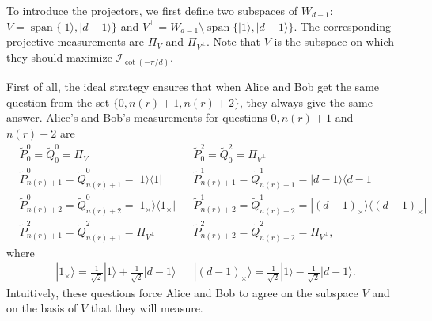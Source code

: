 \documentclass[11pt,letterpaper]{article}
\newcommand{\ket}[1]{|#1\rangle}
\newcommand{\ketbra}[2]{|#1\rangle\langle#2|}
\DeclareMathOperator{\spn}{span}
\newcommand{\1}{\mathbb{1}}
\newcommand{\tP}{\tilde{P}}
\newcommand{\tQ}{\tilde{Q}}
\newcommand{\nr}{n(r)}
\newcommand{\I}{\mathcal{I}}
\theoremstyle{definition}
\begin{document}
To introduce the projectors, 
we first define two subspaces of $W_{d-1}$: $V = \spn\{\ket{1}, \ket{d-1}\}$ and $V^\perp = W_{d-1} \setminus\spn\{\ket{1}, \ket{d-1}\}$.
The corresponding projective measurements are $\Pi_V$ and $\Pi_{V^\perp}$. Note that $V$ is the subspace on which they should maximize $\I_{\cot(-\pi/d)}$.

First of all, the ideal strategy ensures that when 
Alice and Bob get the same question from the set $\{0,\nr+1,\nr+2\}$, they always give the same answer.
Alice's and Bob's measurements for questions $0, \nr+1$ and $\nr+2$ are
\begin{align*}
	&\tP_0^0 = \tQ_0^0 = \Pi_V && \tP_0^2 = \tQ_0^2 = \Pi_{V^\perp} \\
	&\tP_{\nr+1}^0 = \tQ_{\nr+1}^0 = \ketbra{1}{1} &&
	\tP_{\nr+1}^1 = \tQ_{\nr+1}^1 = \ketbra{d-1}{d-1} \\
	&\tP_{\nr+2}^0 = \tQ_{\nr+2}^0 = \ketbra{1_{\times}}{1_{\times}} && \tP_{\nr+2}^1 = \tQ_{\nr+2}^1 = \ketbra{(d-1)_{\times}}{(d-1)_{\times}} \\
	&\tP_{\nr+1}^2 = \tQ_{\nr+1}^2 = \Pi_{V^\perp} &&
	 \tP_{\nr+2}^2 = \tQ_{\nr+2}^2 = \Pi_{V^\perp},
\end{align*}
where
\begin{align*}
    \ket{1_{\times}} = \frac{1}{\sqrt{2}}\ket{1} + \frac{1}{\sqrt{2}}\ket{d-1}
	&&\ket{(d-1)_{\times}} = \frac{1}{\sqrt{2}}\ket{1} - \frac{1}{\sqrt{2}}\ket{d-1}.
\end{align*}
Intuitively, these questions force Alice and Bob to agree on the subspace $V$ and
on the basis of $V$ that they will measure.
\end{document}
